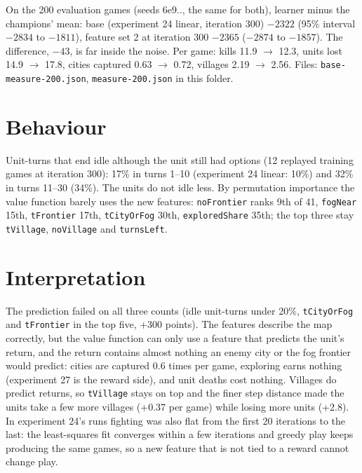 \documentclass{../polyexp}
\begin{document}
On the 200 evaluation games (seeds 6e9.., the same for both), learner minus the champions' mean:
base (experiment 24 linear, iteration 300) $-2322$ (95\% interval $-2834$ to $-1811$), feature set 2 at iteration
300 $-2365$ ($-2874$ to $-1857$). The difference, $-43$, is far inside the noise. Per game: kills 11.9 $\to$ 12.3,
units lost 14.9 $\to$ 17.8, cities captured 0.63 $\to$ 0.72, villages 2.19 $\to$ 2.56. Files:
\texttt{base-measure-200.json}, \texttt{measure-200.json} in this folder.

\section{Behaviour}
Unit-turns that end idle although the unit still had options (12 replayed training games at iteration 300):
17\% in turns 1--10 (experiment 24 linear: 10\%) and 32\% in turns 11--30 (34\%). The units do not idle less.
By permutation importance the value function barely uses the new features: \texttt{noFrontier} ranks 9th of 41,
\texttt{fogNear} 15th, \texttt{tFrontier} 17th, \texttt{tCityOrFog} 30th, \texttt{exploredShare} 35th; the top
three stay \texttt{tVillage}, \texttt{noVillage} and \texttt{turnsLeft}.

\section{Interpretation}
The prediction failed on all three counts (idle unit-turns under 20\%, \texttt{tCityOrFog} and \texttt{tFrontier}
in the top five, +300 points). The features describe the map correctly, but the value function can only use a
feature that predicts the unit's return, and the return contains almost nothing an enemy city or the fog frontier
would predict: cities are captured 0.6 times per game, exploring earns nothing (experiment 27 is the reward side), and
unit deaths cost nothing. Villages do predict returns, so \texttt{tVillage} stays on top and the finer step distance
made the units take a few more villages (+0.37 per game) while losing more units (+2.8). In experiment 24's runs
fighting was also flat from the first 20 iterations to the last: the least-squares fit converges within a few
iterations and greedy play keeps producing the same games, so a new feature that is not tied to a reward cannot
change play.
\end{document}
